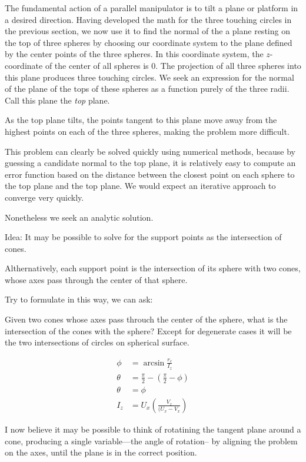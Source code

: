 \documentclass{article}
\begin{document}
The fundamental action of a parallel manipulator is to tilt a plane or platform in a desired direction.
Having developed the math for the three touching circles in the previous section, we now use it
to find the normal of the a plane resting on the top of three spheres by choosing our
coordinate system to the plane defined by the center points of the three spheres.
In this coordinate system, the $z$-coordinate of the center of all spheres is $0$.
The projection of all three spheres into this plane produces three touching circles.
We seek an expression for the normal of the plane of the tops of these spheres as a function
purely of the three radii. Call this plane the {\em top} plane.

As the top plane tilts, the points tangent to this plane move away from the highest points on each of
the three spheres, making the problem more difficult.

This problem can clearly be solved quickly using numerical methods, because by guessing
a candidate normal to the top plane, it is relatively easy to compute an error function based
on the distance between the closest point on each sphere to the top plane and the top plane.
We would expect an iterative approach to converge very quickly.

Nonetheless we seek an analytic solution.


Idea: It may be possible to solve for the support points as the intersection of cones\cite{shene1994lower}.

Althernatively, each support point is the intersection of its sphere
with two cones, whose axes pass through the center of that
sphere.

Try to formulate in this way, we can ask:

Given two cones whose axes pass throuch the center of the sphere,
what is the intersection of the cones with the sphere? Except for
degenerate cases it will be the two intersections of circles on
spherical surface.

\begin{align}
 \phi &= \arcsin{\frac{r_c}{I_z}}\\
\theta &= \frac{\pi}{2} - (\frac{\pi}{2} - \phi)\\
\theta &= \phi\\
I_z &= U_x(\frac{V_z}{(U_x - V_x})
\end{align}

I now believe it may be possible to think of rotatining the tangent plane
around a cone, producing a single variable---the angle of rotation--
by aligning the problem on the axes, until the plane is in the correct
position.




\end{document}
